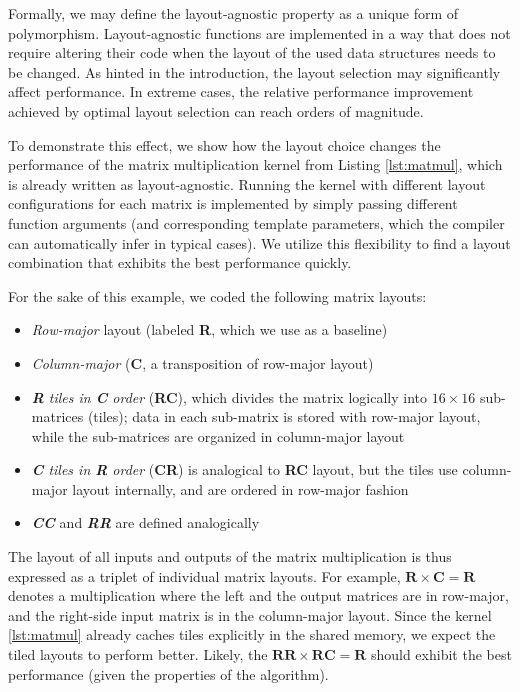 Formally, we may define the layout-agnostic property as a unique form of polymorphism. Layout-agnostic functions are implemented in a way that does not require altering their code when the layout of the used data structures needs to be changed. As hinted in the introduction, the layout selection may significantly affect performance. In extreme cases, the relative performance improvement achieved by optimal layout selection can reach orders of magnitude.

To demonstrate this effect, we show how the layout choice changes the performance of the matrix multiplication kernel from Listing \ref{lst:matmul}, which is already written as layout-agnostic. Running the kernel with different layout configurations for each matrix is implemented by simply passing different function arguments (and corresponding template parameters, which the compiler can automatically infer in typical cases). We utilize this flexibility to find a layout combination that exhibits the best performance quickly.

For the sake of this example, we coded the following matrix layouts:
\begin{itemize}
    \item \emph{Row-major} layout (labeled \textbf{R}, which we use as a baseline)
    \item \emph{Column-major} (\textbf{C}, a transposition of row-major layout)
    \item \emph{\textbf{R} tiles in \textbf{C} order} (\textbf{RC}), which divides the matrix logically into $16\times16$ sub-matrices (tiles); data in each sub-matrix is stored with row-major layout, while the sub-matrices are organized in column-major layout
    \item \emph{\textbf{C} tiles in \textbf{R} order} (\textbf{CR}) is analogical to \textbf{RC} layout, but the tiles use column-major layout internally, and are ordered in row-major fashion
    \item \emph{\textbf{CC}} and \emph{\textbf{RR}} are defined analogically
\end{itemize}

The layout of all inputs and outputs of the matrix multiplication is thus expressed as a triplet of individual matrix layouts. For example, $\textbf{R}\times \textbf{C}=\textbf{R}$ denotes a multiplication where the left and the output matrices are in row-major, and the right-side input matrix is in the column-major layout. Since the kernel \ref{lst:matmul} already caches tiles explicitly in the shared memory, we expect the tiled layouts to perform better. Likely, the $\textbf{RR}\times\textbf{RC}=\textbf{R}$ should exhibit the best performance (given the properties of the algorithm).

